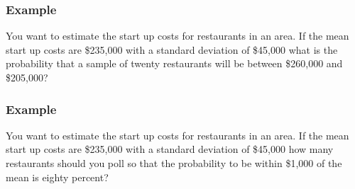 \begin{frame}
  \frametitle{Example}

  You want to estimate the start up costs for restaurants in an
  area. If the mean start up costs are \$235,000 with a standard
  deviation of \$45,000 what is the probability that a sample of
  twenty restaurants will be between \$260,000 and \$205,000?

  \vfill


  \vfill


\end{frame}


\begin{frame}
  \frametitle{Example}

  You want to estimate the start up costs for restaurants in an
  area. If the mean start up costs are \$235,000 with a standard
  deviation of \$45,000 how many restaurants should you poll so that
  the probability to be within \$1,000 of the mean is eighty percent?

  \vfill


  \vfill


\end{frame}


